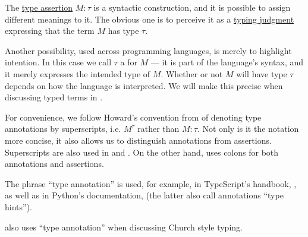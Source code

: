 \begin{concept}\label{con:type_annotation}
  The \hyperref[def:type_assertion]{type assertion} \( M: \tau \) is a syntactic construction, and it is possible to assign different meanings to it. The obvious one is to perceive it as a \hyperref[rem:typing_judgments]{typing judgment} expressing that the term \( M \) has type \( \tau \).

  Another possibility, used across programming languages, is merely to highlight intention. In this case we call \( \tau \) a  for \( M \) --- it is part of the language's syntax, and it merely expresses the intended type of \( M \). Whether or not \( M \) will have type \( \tau \) depends on how the language is interpreted. We will make this precise when discussing typed terms in .

  For convenience, we follow Howard's convention from \cite{Howard1980FormulasAsTypes} of denoting type annotations by superscripts, i.e. \( M^\tau \) rather than \( M: \tau \). Not only is it the notation more concise, it also allows us to distinguish annotations from assertions. Superscripts are also used in \cite{Mimram2020ProgramEqualsProof} and \cite[ch. 5]{Hindley1997BasicSTT}. On the other hand,  uses colons for both annotations and assertions.
\end{concept}
\begin{comments}
  \item The phrase \enquote{type annotation} is used, for example, in TypeScript's handbook, \cite{TypeScript:5.7:handbook}, as well as in Python's documentation, \cite{PythonDocs:3.13:typing} (the latter also call annotations \enquote{type hints}).

   also uses \enquote{type annotation} when discussing Church style typing.
\end{comments}

